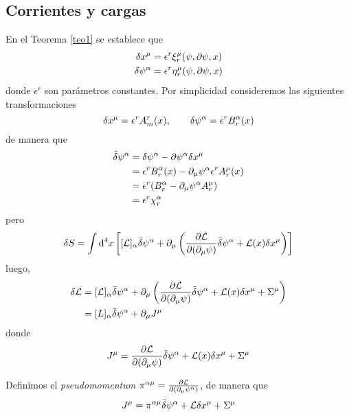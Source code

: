 \subsection{Corrientes y cargas}
En el Teorema \ref{teo1} se establece que
	\begin{align}
  \delta x^\mu &=\epsilon^r\xi_r^\mu (\psi,\partial\psi ,x)\\
  \delta \psi^\alpha  &=\epsilon^r\eta_r^\mu (\psi,\partial\psi ,x)
\end{align}
donde $\epsilon^r$ son parámetros constantes. Por simplicidad consideremos las siguientes transformaciones
\begin{equation}
  \delta x^\mu =\epsilon^rA_m^r(x),\qquad \delta \psi^\alpha =\epsilon^r B_r^\alpha (x)
\end{equation}
de manera que
\begin{align}
  \bar{\delta} \psi^\alpha &=\delta\psi^\alpha -\partial\psi^\alpha \delta x^\mu\\& =\epsilon^rB_r^\alpha (x)-\partial_\mu\psi^\alpha \epsilon^r A_r^\mu (x)\\
  &=\epsilon^r(B_r^\alpha -\partial_\mu\psi^\alpha A_r^\mu )\\
  &=\epsilon^r\chi_r^\alpha 
\end{align}
pero
\begin{equation}
  \delta S=\int\dd^4x\left[[\mathcal{L} ]_\alpha \bar{\delta}\psi^\alpha +\partial_\mu \left(\pdv{\mathcal{L}}{(\partial_\mu\psi)}\bar{\delta}\psi^\alpha +\mathcal{L}(x)\delta x^\mu \right)\right]
\end{equation}
luego,
\begin{align}
  \delta \mathcal{L} &=[\mathcal{L} ]_\alpha \bar{\delta}\psi^\alpha +\partial_\mu \left(\pdv{\mathcal{L}}{(\partial_\mu\psi)}\bar{\delta}\psi^\alpha +\mathcal{L}(x)\delta x^\mu +\Sigma^\mu  \right)\\
  &=[L]_\alpha \bar{\delta}\psi^\alpha +\partial_\mu J^\mu 
\end{align}
donde 
\begin{equation}
  J^\mu =\pdv{\mathcal{L}}{(\partial_\mu\psi)}\bar{\delta}\psi^\alpha +\mathcal{L}(x)\delta x^\mu +\Sigma^\mu 
\end{equation}

Definimos el \textit{pseudomomentum} $\pi ^{\alpha\mu }=\pdv{\mathcal{L}}{(\partial_\mu\psi^\alpha)}$, de manera que
\begin{equation}
    J^\mu =\pi ^{\alpha \mu} \bar{\delta}\psi^\alpha +\mathcal{L}\delta x^\mu +\Sigma^\mu 
\end{equation}

